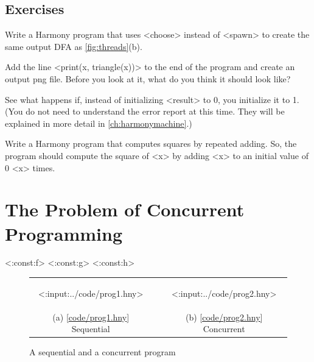 \documentclass{report}
\newcommand{\harmonylink}[1]{%
[\href{https://harmony.cs.cornell.edu/#1}{\underline{#1}}]%
}
\begin{document}
\section*{Exercises}
\begin{problems}
\item Write a Harmony program that uses <{choose}> instead of <{spawn}> to create the same
output DFA as \autoref{fig:threads}(b).
\item Add the line <{print(x, triangle(x))}> to the end of the
program and create an output png file.  Before you look at it, what
do you think it should look like?
\item See what happens if, instead of initializing <{result}> to 0,
you initialize it to 1.  (You do not need to understand the error report at this time.  They will be explained in more detail in \autoref{ch:harmonymachine}.)
\item Write a Harmony program that computes squares by repeated adding.  So, the program
should compute the square of <{x}> by adding <{x}> to an initial value of 0 <{x}> times.
\end{problems}

\chapter{The Problem of Concurrent Programming}
\label{ch:concurrent}

<{:const:f}>
<{:const:g}>
<{:const:h}>

\begin{figure}[h]
\begin{center}
\begin{tabular}{ccc}
\begin{tcolorbox}[width=0.4\linewidth]
<{:input:../code/prog1.hny}>
\end{tcolorbox}
& \rule{0.05\linewidth}{0in} &
\begin{tcolorbox}[width=0.4\linewidth]
<{:input:../code/prog2.hny}>
\end{tcolorbox}
\\
(a) \harmonylink{code/prog1.hny} Sequential && (b) \harmonylink{code/prog2.hny} Concurrent
\end{tabular}
\end{center}
\caption{A sequential and a concurrent program}
\label{fig:progs}
\end{figure}

%
\end{document}
